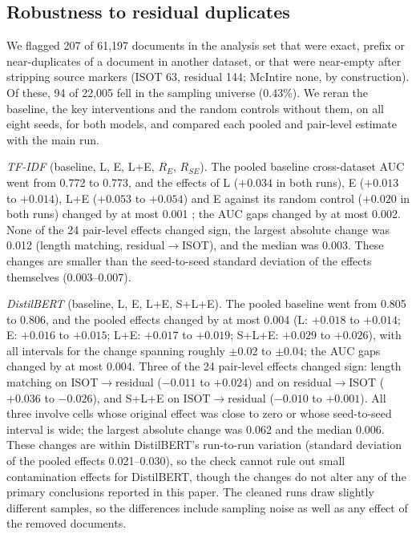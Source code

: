 \subsection{Robustness to residual duplicates}
\label{sec:robust}
We flagged 207 of 61,197 documents in the analysis set that were exact, prefix or near-duplicates of a document in another dataset, or that were near-empty after stripping source markers (ISOT 63, residual 144; McIntire none, by construction). Of these, 94 of 22,005 fell in the sampling universe (0.43\%). We reran the baseline, the key interventions and the random controls without them, on all eight seeds, for both models, and compared each pooled and pair-level estimate with the main run.

\emph{TF-IDF} (baseline, L, E, L+E, $R_E$, $R_{SE}$). The pooled baseline cross-dataset AUC went from 0.772 to 0.773, and the effects of L ($+0.034$ in both runs), E ($+0.013$ to $+0.014$), L+E ($+0.053$ to $+0.054$) and E against its random control ($+0.020$ in both runs) changed by at most 0.001 ; the AUC gaps changed by at most 0.002. None of the 24 pair-level effects changed sign, the largest absolute change was 0.012 (length matching, residual$\rightarrow$ISOT), and the median was 0.003. These changes are smaller than the seed-to-seed standard deviation of the effects themselves (0.003--0.007).

\emph{DistilBERT} (baseline, L, E, L+E, S+L+E). The pooled baseline went from 0.805 to 0.806, and the pooled effects changed by at most 0.004 (L: $+0.018$ to $+0.014$; E: $+0.016$ to $+0.015$; L+E: $+0.017$ to $+0.019$; S+L+E: $+0.029$ to $+0.026$), with all intervals for the change spanning roughly $\pm0.02$ to $\pm0.04$; the AUC gaps changed by at most 0.004. Three of the 24 pair-level effects changed sign: length matching on ISOT$\rightarrow$residual ($-0.011$ to $+0.024$) and on residual$\rightarrow$ISOT ($+0.036$ to $-0.026$), and S+L+E on ISOT$\rightarrow$residual ($-0.010$ to $+0.001$). All three involve cells whose original effect was close to zero or whose seed-to-seed interval is wide; the largest absolute change was 0.062 and the median 0.006. These changes are within DistilBERT's run-to-run variation (standard deviation of the pooled effects 0.021--0.030), so the check cannot rule out small contamination effects for DistilBERT, though the changes do not alter any of the primary conclusions reported in this paper. The cleaned runs draw slightly different samples, so the differences include sampling noise as well as any effect of the removed documents.

